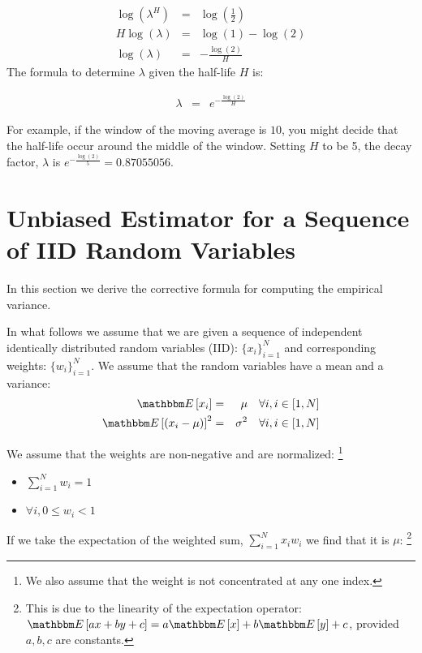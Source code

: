 \documentclass{article}
\newcommand{\E}[1] {\mathbbm E\left[#1\right]}
\begin{document}
\begin{eqnarray*}
    \log(\lambda^H) &=&  \log\left(\frac{1}{2}\right) \\
    H \log(\lambda) &=& \log(1) - \log(2)  \\
    \log(\lambda)   &=& -\frac{\log(2)}{H} 
\end{eqnarray*}
The formula to determine $\lambda$ given the half-life $H$ is:

\begin{eqnarray}
    \lambda &=& e^{-\frac{\log(2)}{H}}
\end{eqnarray}

For example, if the window of the moving average is $10$, you might decide that the 
half-life occur around the middle of the window. Setting $H$ to be 5, the decay factor, $\lambda$ 
is $e^{-\frac{\log(2)}{5}} = 0.87055056$.

\eject

\appendix

\section{Unbiased Estimator for a Sequence of IID Random Variables}
In this section we derive the corrective formula for computing the empirical variance.

In what follows we assume that we are given a sequence of independent identically distributed random variables (IID):
$\{x_i\}_{i=1}^N$ and corresponding weights: $\{w_i\}_{i=1}^N$.
We assume that the random variables have a mean and a variance:
\begin{eqnarray}
    \E{x_i} &=& \mu  \quad \forall i, i \in [1, N] \\
    \E{(x_i - \mu)}^2 &=& \sigma^2 \quad \forall i, i \in [1, N]  
\end{eqnarray}

We assume that the weights are non-negative and are normalized:%
\footnote{We also assume that the weight is not concentrated at any
one index.}
\begin{itemize}
    \item{$\sum_{i=1}^N w_i = 1$}
    \item{$\forall i, 0 \le w_i < 1$}
\end{itemize}

If we take the expectation of the weighted sum, $\sum_{i=1}^N x_i w_i$ we find that it is $\mu$:%
\footnote{This is due to the linearity of the expectation operator:
$\E{a x + b y + c} = a \E{x} + b \E{y} + c$, provided $a,b,c$ are constants.}
\end{document}

